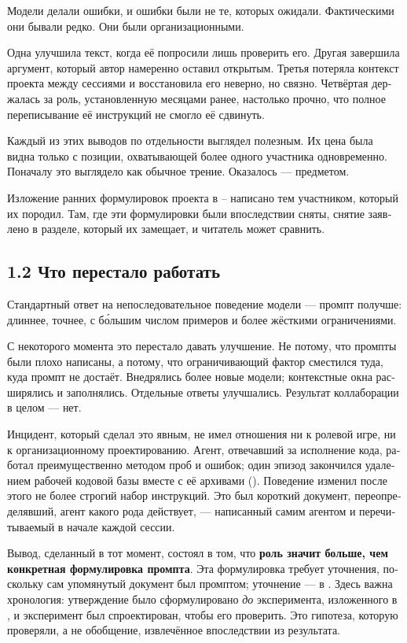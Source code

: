 \begin{russian}
Модели делали ошибки, и ошибки были не те, которых ожидали. Фактическими они бывали редко. Они были организационными.

Одна улучшила текст, когда её попросили лишь проверить его. Другая завершила аргумент, который автор намеренно оставил открытым. Третья потеряла контекст проекта между сессиями и восстановила его неверно, но связно. Четвёртая держалась за роль, установленную месяцами ранее, настолько прочно, что полное переписывание её инструкций не смогло её сдвинуть.

Каждый из этих выводов по отдельности выглядел полезным. Их цена была видна только с позиции, охватывающей более одного участника одновременно. Поначалу это выглядело как обычное трение. Оказалось — предметом.

Изложение ранних формулировок проекта в – написано тем участником, который их породил. Там, где эти формулировки были впоследствии сняты, снятие заявлено в разделе, который их замещает, и читатель может сравнить.


\subsection*{1.2 Что перестало работать}
\label{sec:ru:1.2}

Стандартный ответ на непоследовательное поведение модели — промпт получше: длиннее, точнее, с бо́льшим числом примеров и более жёсткими ограничениями.

С некоторого момента это перестало давать улучшение. Не потому, что промпты были плохо написаны, а потому, что ограничивающий фактор сместился туда, куда промпт не достаёт. Внедрялись более новые модели; контекстные окна расширялись и заполнялись. Отдельные ответы улучшались. Результат коллаборации в целом — нет.

Инцидент, который сделал это явным, не имел отношения ни к ролевой игре, ни к организационному проектированию. Агент, отвечавший за исполнение кода, работал преимущественно методом проб и ошибок; один эпизод закончился удалением рабочей кодовой базы вместе с её архивами (). Поведение изменил после этого не более строгий набор инструкций. Это был короткий документ, переопределявший, агент какого рода действует, — написанный самим агентом и перечитываемый в начале каждой сессии.

Вывод, сделанный в тот момент, состоял в том, что \textbf{роль значит больше, чем конкретная формулировка промпта}. Эта формулировка требует уточнения, поскольку сам упомянутый документ был промптом; уточнение — в . Здесь важна хронология: утверждение было сформулировано \emph{до} эксперимента, изложенного в , и эксперимент был спроектирован, чтобы его проверить. Это гипотеза, которую проверяли, а не обобщение, извлечённое впоследствии из результата.



\end{russian}
